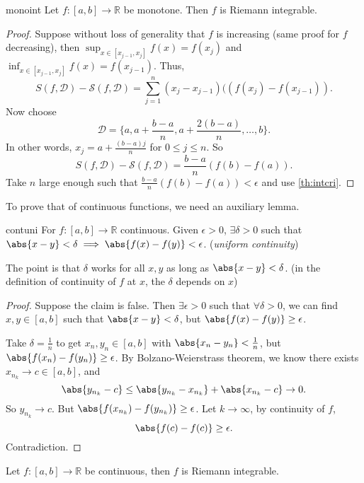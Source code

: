 \begin{theorem}{}{monoint}
    Let \(f: [a,b] \to \mathbb{R}\) be monotone. Then \(f\) is Riemann integrable.
\end{theorem}
\begin{proof}
    Suppose without loss of generality that \(f\) is increasing (same proof for \(f\) decreasing), then \(\sup_{x\in[x_{j-1},x_j]}f(x) = f(x_j)\) and \(\inf_{x\in[x_{j-1},x_j]}f(x) = f(x_{j-1})\). Thus,
    \[
        S(f,\mathcal{D}) - \mathscr{S}(f,\mathcal{D}) = \sum_{j=1}^{n} (x_j - x_{j-1})((f(x_j) - f(x_{j-1})).
    \]
    Now choose
    \[
        \mathcal{D} = \{a, a + \frac{b-a}{n}, a + \frac{2(b-a)}{n} , \dots, b\}.
    \]
    In other words, \(x_j = a + \frac{(b-a)j}{n}\) for \(0 \leq j \leq n\). So
    \[
        S(f, \mathcal{D}) - \mathscr{S}(f, \mathcal{D}) = \frac{b-a}{n}(f(b) - f(a)).
    \]
    Take \(n\) large enough such that \(\frac{b-a}{n}(f(b) - f(a))<\epsilon\) and use \cref{th:intcri}.
\end{proof}
To prove that of continuous functions, we need an auxiliary lemma.
\begin{lemma}{}{contuni}
    For \(f: [a,b] \to \mathbb{R}\) continuous. Given \(\epsilon > 0\), \(\exists \delta> 0\) such that \(\abs{x-y}<\delta \implies \abs{f(x) - f(y)}<\epsilon\). (\textit{uniform continuity})
\end{lemma}
The point is that \(\delta\) works for all \(x, y\) as long as \(\abs{x-y}<\delta\). (in the definition of continuity of \(f\) at \(x\), the \(\delta\) depends on \(x\))
\begin{proof}
    Suppose the claim is false. Then \(\exists \epsilon>0\) such that \(\forall \delta > 0\), we can find \(x, y \in [a,b]\) such that \(\abs{x-y} < \delta\), but \(\abs{f(x) - f(y)} \geq \epsilon\).

    Take \(\delta = \frac{1}{n}\) to get \(x_n, y_n \in [a,b]\) with \(\abs{x_n - y_n} < \frac{1}{n}\), but \(\abs{f(x_n) - f(y_n)} \geq \epsilon\). By Bolzano-Weierstrass theorem, we know there exists \(x_{n_k} \to c \in [a,b]\), and
    \[
        \abs{y_{n_k} - c} \leq \abs{y_{n_k} - x_{n_k}} + \abs{x_{n_k} - c} \to 0.
    \]
    So \(y_{n_k} \to c\). But \(\abs{f(x_{n_k}) - f(y_{n_k})} \geq \epsilon\). Let \(k \to \infty\), by continuity of \(f\),
    \[
        \abs{f(c) - f(c)} \geq \epsilon.
    \]
    Contradiction.
\end{proof}
\begin{theorem}{}{}
    Let \(f: [a,b] \to \mathbb{R}\) be continuous, then \(f\) is Riemann integrable.
\end{theorem}
